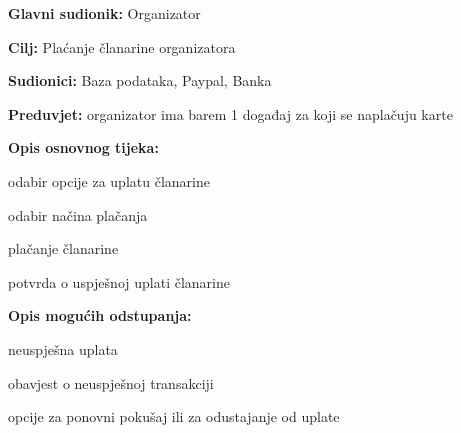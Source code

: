 					\noindent {}
					\begin{packed_item}
	
						\item \textbf{Glavni sudionik: }Organizator
						\item  \textbf{Cilj:} Plaćanje članarine organizatora
						\item  \textbf{Sudionici:} Baza podataka, Paypal, Banka
						\item  \textbf{Preduvjet:} organizator ima barem 1 događaj za koji se naplačuju karte
						\item  \textbf{Opis osnovnog tijeka:}
						
						\item[] \begin{packed_enum}
	
							\item odabir opcije za uplatu članarine
							\item odabir načina plačanja 
							\item plačanje članarine
							\item potvrda o uspješnoj uplati članarine
						\end{packed_enum}
						
						\item  \textbf{Opis mogućih odstupanja:}
						
						\item[] \begin{packed_item}
	
							\item[2.a] neuspješna uplata
							\item[] \begin{packed_enum}
								
								\item obavjest o neuspješnoj transakciji
								\item opcije za ponovni pokušaj ili za odustajanje od uplate
								
							\end{packed_enum}
							
						\end{packed_item}
							
					\end{packed_item}
					
